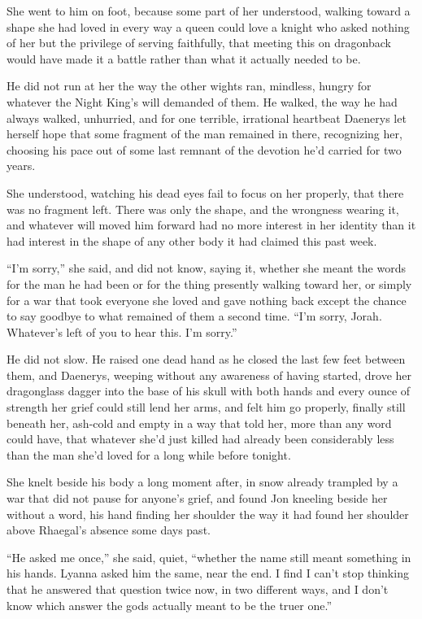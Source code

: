 \sceneBreak

She went to him on foot, because some part of her understood, walking toward a shape she had loved in every way a queen could love a knight who asked nothing of her but the privilege of serving faithfully, that meeting this on dragonback would have made it a battle rather than what it actually needed to be.

He did not run at her the way the other wights ran, mindless, hungry for whatever the Night King’s will demanded of them. He walked, the way he had always walked, unhurried, and for one terrible, irrational heartbeat Daenerys let herself hope that some fragment of the man remained in there, recognizing her, choosing his pace out of some last remnant of the devotion he’d carried for two years.

She understood, watching his dead eyes fail to focus on her properly, that there was no fragment left. There was only the shape, and the wrongness wearing it, and whatever will moved him forward had no more interest in her identity than it had interest in the shape of any other body it had claimed this past week.

“I’m sorry,” she said, and did not know, saying it, whether she meant the words for the man he had been or for the thing presently walking toward her, or simply for a war that took everyone she loved and gave nothing back except the chance to say goodbye to what remained of them a second time. “I’m sorry, Jorah. Whatever’s left of you to hear this. I’m sorry.”

He did not slow. He raised one dead hand as he closed the last few feet between them, and Daenerys, weeping without any awareness of having started, drove her dragonglass dagger into the base of his skull with both hands and every ounce of strength her grief could still lend her arms, and felt him go properly, finally still beneath her, ash-cold and empty in a way that told her, more than any word could have, that whatever she’d just killed had already been considerably less than the man she’d loved for a long while before tonight.

\sceneBreak

She knelt beside his body a long moment after, in snow already trampled by a war that did not pause for anyone’s grief, and found Jon kneeling beside her without a word, his hand finding her shoulder the way it had found her shoulder above Rhaegal’s absence some days past.

“He asked me once,” she said, quiet, “whether the name still meant something in his hands. Lyanna asked him the same, near the end. I find I can’t stop thinking that he answered that question twice now, in two different ways, and I don’t know which answer the gods actually meant to be the truer one.”

